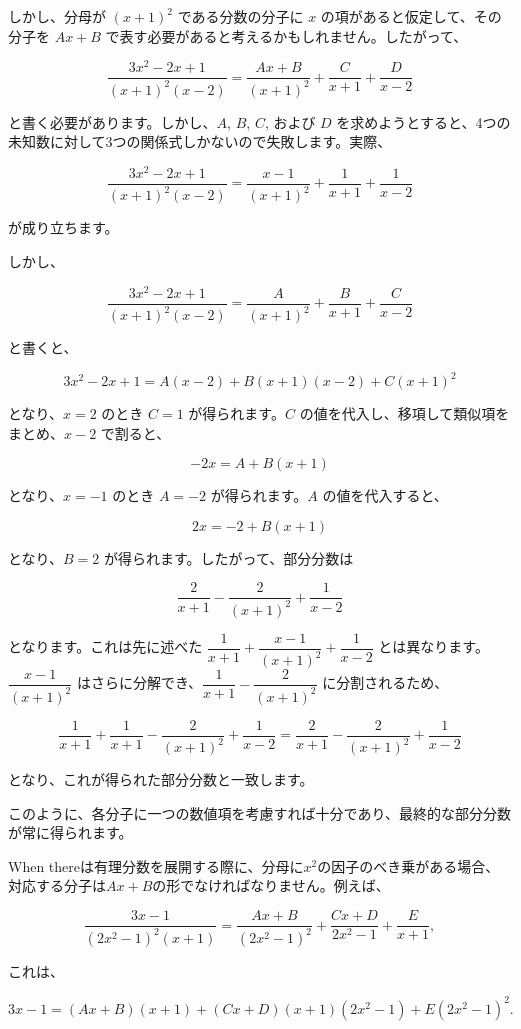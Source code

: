 \documentclass[a4paper,11pt,openany]{ltjsbook}
\begin{document}
しかし、分母が $(x+1)^2$ である分数の分子に $x$ の項があると仮定して、その分子を $Ax+B$ で表す必要があると考えるかもしれません。したがって、

\[
\frac{3x^2 - 2x + 1}{(x+1)^2(x-2)}
  = \frac{Ax+B}{(x+1)^2} + \frac{C}{x+1} + \frac{D}{x-2}
\]

と書く必要があります。しかし、$A$, $B$, $C$, および $D$ を求めようとすると、4つの未知数に対して3つの関係式しかないので失敗します。実際、

\[
\frac{3x^2 - 2x + 1}{(x+1)^2(x-2)}
  = \frac{x-1}{(x+1)^2} + \frac{1}{x+1} + \frac{1}{x-2}
\]

が成り立ちます。

しかし、

\[
\frac{3x^2 - 2x + 1}{(x+1)^2(x-2)}
  = \frac{A}{(x+1)^2} + \frac{B}{x+1} + \frac{C}{x-2}
\]

と書くと、

\[
3x^2 - 2x + 1 = A(x-2) + B(x+1)(x-2) + C(x+1)^2
\]

となり、$x=2$ のとき $C=1$ が得られます。$C$ の値を代入し、移項して類似項をまとめ、$x-2$ で割ると、

\[
-2x = A + B(x+1)
\]

となり、$x=-1$ のとき $A=-2$ が得られます。$A$ の値を代入すると、

\[
2x = -2 + B(x+1)
\]

となり、$B=2$ が得られます。したがって、部分分数は

\[
\frac{2}{x+1} - \frac{2}{(x+1)^2} + \frac{1}{x-2}
\]

となります。これは先に述べた $\dfrac{1}{x+1} + \dfrac{x-1}{(x+1)^2} + \dfrac{1}{x-2}$ とは異なります。$\dfrac{x-1}{(x+1)^2}$ はさらに分解でき、$\dfrac{1}{x+1} - \dfrac{2}{(x+1)^2}$ に分割されるため、

\[
\frac{1}{x+1} + \frac{1}{x+1} - \frac{2}{(x+1)^2} + \frac{1}{x-2}
  = \frac{2}{x+1} - \frac{2}{(x+1)^2} + \frac{1}{x-2}
\]

となり、これが得られた部分分数と一致します。

このように、各分子に一つの数値項を考慮すれば十分であり、最終的な部分分数が常に得られます。

When thereは有理分数を展開する際に、分母に$x^2$の因子のべき乗がある場合、対応する分子は$Ax+B$の形でなければなりません。例えば、

\[
\frac{3x-1}{(2x^2-1)^2(x+1)} = \frac{Ax+B}{(2x^2-1)^2} + \frac{Cx+D}{2x^2-1} + \frac{E}{x+1},
\]

これは、

\[
3x - 1 = (Ax + B)(x + 1) + (Cx + D)(x + 1)(2x^2 - 1) + E(2x^2 - 1)^2.
\]
\end{document}
